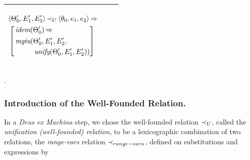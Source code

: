 \documentclass[runningheads]{llncs}
\DeclareMathOperator{\uimplies}{\Rightarrow}
\DeclareMathOperator{\unify}{\emph{unify}}
\DeclareMathOperator{\idem}{\emph{idem}}
\DeclareMathOperator{\mgiu}{\emph{mgiu}}
\begin{document}
    



\noindent 


  \begin{center}
  \begin{tabular}{|m{}|m{}||m{}|}
\hline
\begin{center}
{$\begin{aligned}
&\langle\Thet{0}', \E{1}', \E{2}'\rangle \, \expsub{\prec}{U} \, \langle\thet{0}, \e{1}, \e{2}\rangle \uimplies \\
&\left[\begin{aligned}&\idem(\Thet{0}') \uimplies \\
 &\begin{aligned}
    {\,\mgiu}(&\Thet{0}', \E{1}', \E{2}', \\
    &\unify(\Thet{0}', \E{1}', \E{2}')) 
\end{aligned}
\end{aligned}\right]\end{aligned}$} \hspace{1cm} 
\end{center}& &  \\  \hline
\end{tabular}.
\end{center}

\subsubsection{Introduction of the Well-Founded Relation.}\label{par:wfrelunif} In a \emph{Deus ex Machina} step, we chose the well-founded relation ${\prec}_{U}$, called the \emph{unification \textup{(}\!well-founded\textup{)} relation}, to be a lexicographic combination of two relations, the \emph{range-vars} relation
${\prec}_{range-vars}$, defined on substitutions and expressions by
\end{document}
